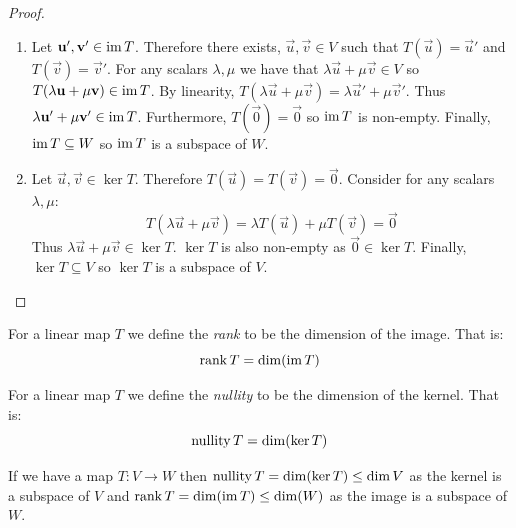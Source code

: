 \documentclass[../main.tex]{subfiles}
\begin{document}
\begin{proof}
\begin{enumerate}
  \item Let $\mathbf{\bm{u}}', \mathbf{\bm{v}}' \in \operatorname{im} T$.
    Therefore there exists, $\vec{u}, \vec{v} \in V$ such that $T(\vec{u}) = \vec{u}'$ and $T(\vec{v}) = \vec{v}'$.
    For any scalars $\lambda, \mu$ we have that $\lambda \vec{u} + \mu \vec{v} \in V$ so $T(\lambda \mathbf{\bm{u}} + \mu \mathbf{\bm{v}}) \in \operatorname{im} T$.
    By linearity, $T(\lambda \vec{u} + \mu \vec{v}) = \lambda \vec{u}' + \mu \vec{v}'$.
    Thus $\lambda \mathbf{\bm{u}}' + \mu \mathbf{\bm{v}}' \in \operatorname{im} T$.
    Furthermore, $T(\vec{0}) = \vec{0}$ so $\operatorname{im} T$ is non-empty.
    Finally, $\operatorname{im} T \subseteq W$ so $\operatorname{im} T$ is a subspace of $W$.
  \item Let $\vec{u}, \vec{v} \in \ker T$. Therefore $T(\vec{u}) = T(\vec{v}) = \vec{0}$.
    Consider for any scalars $\lambda, \mu$:
    \[
      T(\lambda \vec{u} + \mu \vec{v}) = \lambda T(\vec{u}) + \mu T(\vec{v}) = \vec{0}
    \]
    Thus $\lambda \vec{u} + \mu \vec{v} \in \ker T$.
    $\ker T$ is also non-empty as $\vec{0} \in \ker T$.
    Finally, $\ker T \subseteq V$ so $\ker T$ is a subspace of $V$.
\end{enumerate}
\end{proof}
\begin{definition}[Rank]
  For a linear map $T$ we define the \textit{rank} to be the dimension of the image. That is:
  \[
    \operatorname{rank} T = \dim (\operatorname{im} T)
  \]
\end{definition}
\begin{definition}[Nullity]
  For a linear map $T$ we define the \textit{nullity} to be the dimension of the kernel. That is:
  \[
    \operatorname{nullity} T = \dim (\ker T)
  \]
\end{definition}
\begin{remark}
  If we have a map $T: V \to W$ then $\operatorname{nullity} T = \dim(\ker T) \leq \dim V$ as the kernel is a subspace of $V$ and $\operatorname{rank} T = \dim(\operatorname{im} T) \leq \dim(W)$ as the image is a subspace of $W$.
\end{remark}
\end{document}
